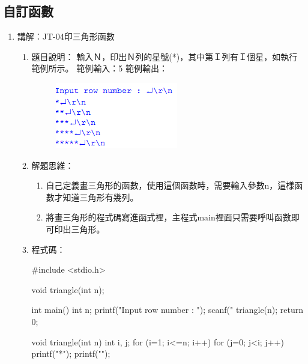 \subsection{自訂函數}
\begin{enumerate}
	\item 講解︰JT-04印三角形函數
	\begin{enumerate}
		\item 題目說明：
		\subitem 輸入Ｎ，印出Ｎ列的星號(*)，其中第Ｉ列有Ｉ個星，如執行範例所示。
		\subitem 範例輸入：5
		\subitem 範例輸出：
		\begin{figure}[H]
			\centering
			\includegraphics{fig/JT04fig}
		\end{figure}
		
		\item 解題思維：
		\begin{enumerate}
			\item 自己定義畫三角形的函數，使用這個函數時，需要輸入參數n，這樣函數才知道三角形有幾列。
			\item 將畫三角形的程式碼寫進函式裡，主程式main裡面只需要呼叫函數即可印出三角形。
		\end{enumerate}
		
		\item 程式碼：
		\begin{cppcode}
			#include <stdio.h>
			
			void triangle(int n);
			
			int main()
			{
				int n;
				printf("Input row number : \n");
				scanf("%
				triangle(n);
				return 0;
			}
			
			void triangle(int n)
			{
				int i, j;
				for (i=1; i<=n; i++) {
					for (j=0; j<i; j++) { printf("*"); }
					printf("\n");
				}
			}
			
		\end{cppcode}
	\end{enumerate}
	

\end{enumerate}
